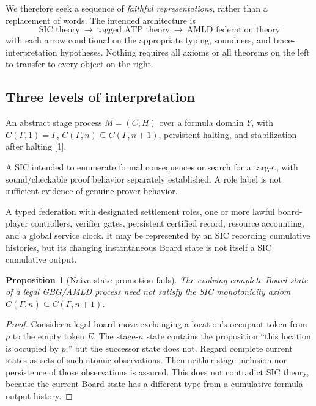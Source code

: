 \documentclass[10pt,letterpaper]{article}
\newtheorem{proposition}[definition]{Proposition}
\theoremstyle{remark}\newtheorem{remark}[definition]{Remark}
\begin{document}
We therefore seek a sequence of \emph{faithful representations}, rather than a replacement of words. The intended architecture is
\[
\boxed{\text{SIC theory}\ \longrightarrow\ \text{tagged ATP theory}\ \longrightarrow\ \text{AMLD federation theory}}
\]
with each arrow conditional on the appropriate typing, soundness, and trace-interpretation hypotheses. Nothing requires all axioms or all theorems on the left to transfer to every object on the right.

\subsection{Three levels of interpretation}
\begin{description}[style=nextline,leftmargin=0pt]
\item[Level S: SIC.] An abstract stage process $M=(C,H)$ over a formula domain $Y$, with $C(\Gamma,1)=\Gamma$, $C(\Gamma,n)\subseteq C(\Gamma,n+1)$, persistent halting, and stabilization after halting [1].
\item[Level A: ATP.] A SIC intended to enumerate formal consequences or search for a target, with sound/checkable proof behavior separately established. A role label is not sufficient evidence of genuine prover behavior.
\item[Level F: AMLD.] A typed federation with designated settlement roles, one or more lawful board-player controllers, verifier gates, persistent certified record, resource accounting, and a global service clock. It may be represented by an SIC recording cumulative histories, but its changing instantaneous Board state is not itself a SIC cumulative output.
\end{description}

\begin{proposition}[Naive state promotion fails]
The evolving complete Board state of a legal GBG/AMLD process need not satisfy the SIC monotonicity axiom $C(\Gamma,n)\subseteq C(\Gamma,n+1)$.
\end{proposition}
\begin{proof}
Consider a legal board move exchanging a location's occupant token from $p$ to the empty token $E$. The stage-$n$ state contains the proposition ``this location is occupied by $p$,'' but the successor state does not. Regard complete current states as sets of such atomic observations. Then neither stage inclusion nor persistence of those observations is assured. This does not contradict SIC theory, because the current Board state has a different type from a cumulative formula-output history.
\end{proof}
\end{document}
